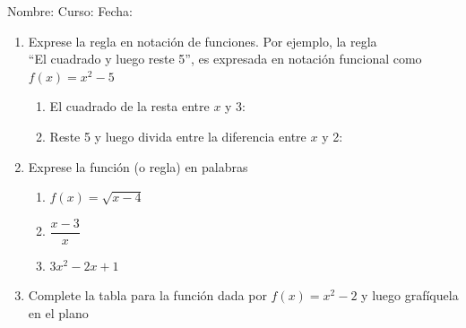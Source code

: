 \documentclass[fleqn]{article}
\newcommand{\LineaNombre}{%
\par
\vspace{\baselineskip}
Nombre:\hrulefill \; Curso: \underline{\hspace*{48pt}} \; Fecha: \underline{\hspace*{2.5cm}} \relax
\par}
\begin{document}
\LineaNombre
\begin{enumerate}
 \item Exprese la regla en notación de funciones. Por ejemplo, la regla\\
  ``El cuadrado y luego reste 5'', es expresada en notación funcional como $f(x)=x^{2}-5$
 \begin{enumerate}
  \item El cuadrado de la resta entre $x$ y 3: \dotfill
  \item Reste 5 y luego divida entre la diferencia entre $x$ y 2: \dotfill
 \end{enumerate}
\item Exprese la función (o regla) en palabras
\begin{enumerate}
 \item $f(x)=\sqrt{x-4}$ \dotfill
 \item $\dfrac{x-3}{x}$ \dotfill
 \item $3x^{2}-2x+1$\dotfill
\end{enumerate}
\item Complete la tabla para la función dada por $f(x)=x^{2}-2$ y luego grafíquela en el plano


\end{enumerate}
\end{document}
